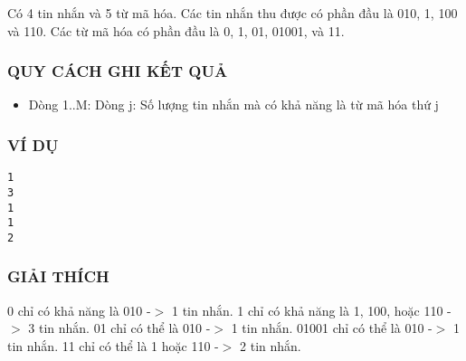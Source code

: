    Có 4 tin nhắn và 5 từ mã hóa. Các tin nhắn thu được có phần đầu là 010, 1, 100 và 110. Các từ mã hóa có phần đầu là 0, 1, 01, 01001, và 11.  

\subsubsection{   QUY CÁCH GHI KẾT QUẢ  }
\begin{itemize}
	\item     Dòng 1..M: Dòng j: Số lượng tin nhắn mà có khả năng là từ mã hóa thứ j   
\end{itemize}

\subsubsection{   VÍ DỤ  }
\begin{verbatim}
1
3
1
1
2
\end{verbatim}

\subsubsection{   GIẢI THÍCH  }

   0 chỉ có khả năng là 010 -$>$ 1 tin nhắn. 1 chỉ có khả năng là 1, 100, hoặc 110 -$>$ 3 tin nhắn. 01 chỉ có thể là 010 -$>$ 1 tin nhắn. 01001 chỉ có thể là 010 -$>$ 1 tin nhắn. 11 chỉ có thể là 1 hoặc 110 -$>$ 2 tin nhắn.  
